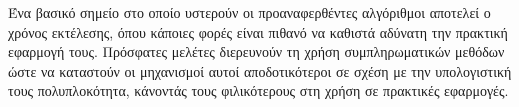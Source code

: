 Ένα βασικό σημείο στο οποίο υστερούν οι προαναφερθέντες αλγόριθμοι αποτελεί ο χρόνος εκτέλεσης, όπου κάποιες φορές είναι πιθανό να καθιστά αδύνατη την πρακτική εφαρμογή τους. Πρόσφατες μελέτες διερευνούν τη χρήση συμπληρωματικών μεθόδων ώστε να καταστούν οι μηχανισμοί αυτοί αποδοτικότεροι σε σχέση με την υπολογιστική τους πολυπλοκότητα, κάνοντάς τους φιλικότερους στη χρήση σε πρακτικές εφαρμογές. \textlatin{\cite{mohammadian2014fast}}